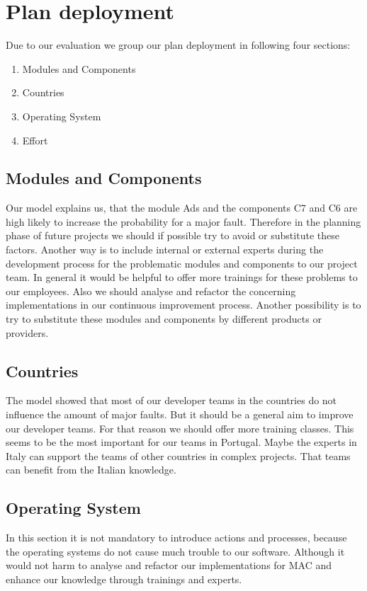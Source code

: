 \chapter{Plan deployment}
Due to our evaluation we group our plan deployment in following four sections:
\begin{enumerate}
	\item Modules and Components
	\item Countries
	\item Operating System
	\item Effort
\end{enumerate}

\section{Modules and Components}
Our model explains us, that the module Ads and the components C7 and C6 are high likely to increase the probability for a major fault. Therefore in the planning phase of future projects we should if possible try to avoid or substitute these factors. Another way is to include internal or external experts during the development process for the problematic modules and components to our project team. In general it would be helpful to offer more trainings for these problems to our employees. Also we should analyse and refactor the concerning implementations in our continuous improvement process. Another possibility is to try to substitute these modules and components by different products or providers.

\section{Countries} 
The model showed that most of our developer teams in the countries do not influence the amount of major faults. But it should be a general aim to improve our developer teams. For that reason we should offer more training classes. This seems to be the most important for our teams in Portugal. Maybe the experts in Italy can support the teams of other countries in complex projects. That teams can benefit from the Italian knowledge.

\section{Operating System}
In this section it is not mandatory to introduce actions and processes, because the operating systems do not cause much trouble to our software. Although it would not harm to analyse and refactor our implementations for MAC and enhance our knowledge through trainings and experts.

